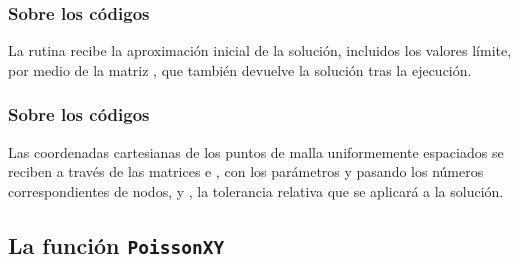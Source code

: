 \documentclass[12pt]{beamer}
\begin{document}
\begin{frame}
\frametitle{Sobre los códigos}
La rutina recibe la aproximación inicial de la solución, incluidos los valores límite, por medio de la matriz \break \hfill {}, que también devuelve la solución tras la ejecución.
\end{frame}
\begin{frame}
\frametitle{Sobre los códigos}
Las coordenadas cartesianas de los puntos de malla uniformemente espaciados se reciben a través de las matrices  e , con los parámetros  y  pasando los números correspondientes de nodos, y , la tolerancia relativa que se aplicará a la solución.
\end{frame}

\subsection{La función \texttt{PoissonXY}}
\end{document}
